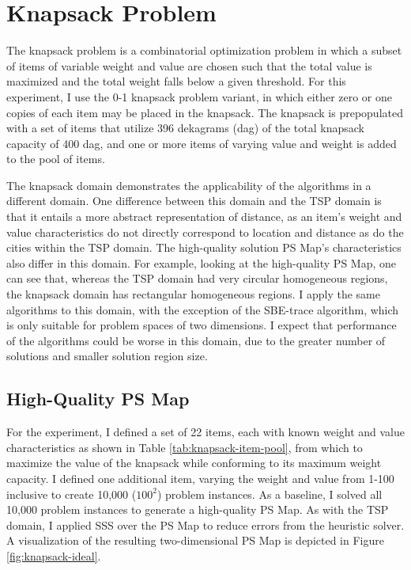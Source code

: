 \section{Knapsack Problem}

The knapsack problem is a combinatorial optimization problem in which a subset of items of variable weight and value are chosen such that the total value is maximized and the total weight falls below  a given threshold.  For this experiment, I use the 0-1 knapsack problem variant, in which either zero or one copies of each item may be placed in the knapsack.  The knapsack is prepopulated with a set of items that utilize 396 dekagrams (dag) of the total knapsack capacity of 400 dag, and one or more items  of varying value and weight is added to the pool of items.

The knapsack domain demonstrates the applicability of the algorithms in a different domain.  One difference between this domain and the TSP domain is that it entails a more abstract representation of distance, as an item's  weight and value characteristics do not directly correspond to location and  distance as do the cities within the TSP domain. The high-quality solution PS Map's characteristics also differ in this domain.  For example, looking at the high-quality PS Map, one can see that, whereas the TSP domain had very circular homogeneous regions, the knapsack domain has rectangular homogeneous regions.  I apply the same algorithms to this domain, with the exception of the SBE-trace algorithm, which is only suitable for problem spaces of two dimensions.  I expect that performance of the algorithms could be worse in this domain, due to the greater number of solutions and smaller solution region size.



\subsection{High-Quality PS Map} For the  experiment, I defined a set of 22 items, each with known weight and value characteristics as shown in Table \ref{tab:knapsack-item-pool}, from which to maximize the value of the knapsack while conforming to its maximum weight capacity.  I defined one additional item, varying the weight and value from 1-100 inclusive to create 10,000 ($\textrm{100}^{\textrm{2}}$) problem instances.  As a baseline, I solved all 10,000 problem instances to generate a high-quality PS Map.  As with the TSP domain, I applied SSS over the PS Map to reduce errors from the heuristic solver.  A visualization of the resulting two-dimensional PS Map is depicted in Figure \ref{fig:knapsack-ideal}.

